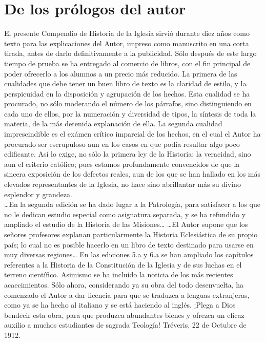 \raggedbottom{} \documentclass[12pt]{book}
\begin{document}
\section{De los prólogos del autor}
El presente Compendio de Historia de la Iglesia sirvió durante diez
años como texto para las explicaciones del Autor, impreso como manuscrito en una corta tirada, antes de darlo definitivamente a la publicidad. Sólo después de este largo tiempo de prueba se ha entregado al
comercio de libros, con el fin principal de poder ofrecerlo a los alumnos a un precio más reducido.
La primera de las cualidades que debe tener un buen libro de texto
es la claridad de estilo, y la perspicuidad en la disposición y agrupación de los hechos. Esta cualidad se ha procurado, no sólo moderando el número de los párrafos, sino distinguiendo en cada uno de
ellos, por la numeración y diversidad de tipos, la síntesis de toda la
materia, de la más detenida explanación de ella.
La segunda cualidad imprescindible es el exámen crítico imparcial
de los hechos, en el cual el Autor ha procurado ser escrupuloso aun
en los casos en que podía resultar algo poco edificante. Así lo exige,
no sólo la primera ley de la Historia: la veracidad, sino aun el criterio
católico; pues estamos profundamente convencidos de que la sincera
exposición de los defectos reales, aun de los que se han hallado en los
más elevados representantes de la Iglesia, no hace sino abrillantar
más su divino esplendor y grandeza.\\
\ldots En la segunda edición se ha dado lugar a la Patrología, para
satisfacer a los que no le dedican estudio especial como asignatura separada, y se ha refundido y ampliado el estudio de la Historia de las
Misiones\ldots
\ldots El Autor supone que los señores profesores explanan particularmente la Historia Eclesiástica de su propio país; lo cual no es posible
hacerlo en un libro de texto destinado para usarse en muy diversas
regiones\ldots
En las ediciones 5.a y 6.a se han ampliado los capítulos referentes
a la Historia de la Constitución de la Iglesia y de sus luchas en el terreno científico. Asimismo se ha incluído la noticia de los más recientes acaecimientos.
Sólo ahora, considerando ya su obra del todo desenvuelta, ha comenzado el Autor a dar licencia para que se traduzca a lenguas extranjeras, como ya se ha hecho al italiano y se está haciendo al inglés.
¡Plega a Dios bendecir esta obra, para que produzca abundantes
bienes y ofrezca un eficaz auxilio a muchos estudiantes de sagrada
Teología!
Tréveris, 22 de Octubre de 1912.
\end{document}
